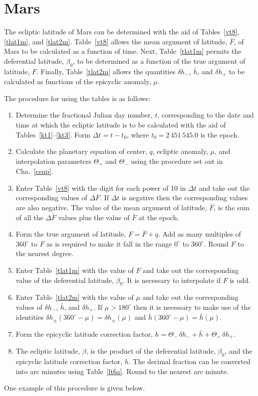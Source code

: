 \section{Mars}
The ecliptic latitude of Mars can be determined with the aid of Tables~\ref{vt8}, \ref{tlat1m}, and \ref{tlat2m}. Table~\ref{vt8} allows
the mean argument of latitude, $\bar{F}$, of Mars to be calculated as a function of
time. Next, Table~\ref{tlat1m} permits the deferential latitude, $\beta_0$, to
be determined as a function of the true argument of latitude, $F$. Finally, Table~\ref{tlat2m} allows the quantities
$\delta h_-$, $\bar{h}$, and $\delta h_+$ to be calculated as functions of the epicyclic
anomaly, $\mu$. 

The procedure for using the tables is as follows:
\begin{enumerate}
\item Determine the fractional Julian day number, $t$, corresponding to the date and time
at which the ecliptic latitude is to be calculated with the aid of Tables~\ref{kt1}--\ref{kt3}. Form $\Delta t = t-t_0$, where $t_0=2\,451\,545.0$ is the epoch. 
\item Calculate the planetary equation
of center, $q$, ecliptic anomaly, $\mu$, and 
interpolation parameters $\Theta_+$ and $\Theta_-$ using the
procedure set out in Cha.~\ref{csup}.
\item Enter Table~\ref{vt8} with the digit for each power of 10
in ${\Delta} t$ and take out the corresponding values of $\Delta\bar{F}$. If $\Delta t$ is negative then the corresponding
values are also negative.
The value of the mean argument of latitude, $\bar{F}$, is the
sum of all the $\Delta\bar{F}$ values plus the value of $\bar{F}$ at the epoch.  
\item Form the true argument of latitude,
$F=\bar{F} + q$. Add as many multiples of $360^\circ$ to $F$ 
as is required to make it fall in the range $0^\circ$ to $360^\circ$.
Round $F$ to the nearest degree.
\item Enter Table~\ref{tlat1m} with the value of $F$ and take out the
corresponding value of the deferential latitude, $\beta_0$. It is necessary to interpolate if $F$ is odd.
\item Enter Table~\ref{tlat2m} with the value of $\mu$ and take
out the corresponding values of $\delta h_-$, $\bar{h}$, and
$\delta h_+$. If $\mu > 180^\circ$ then it is necessary to make use
of the identities $\delta h_\pm(360^\circ - \mu) = \delta h_\pm(\mu)$
and $\bar{h}(360^\circ - \mu) = \bar{h}(\mu)$.
\item Form the epicyclic latitude correction factor, $h = \Theta_-\,\delta h_-+ \bar{h}
+ \Theta_+\,\delta h_+$.
\item The ecliptic latitude, $\beta$, is the product of the deferential latitude, 
$\beta_0$,  and the epicyclic latitude correction factor, $h$.  The decimal fraction can
be converted into arc minutes
using Table~\ref{lt6a}. Round to the nearest arc minute. 
\end{enumerate}
One example of this procedure is given below.

